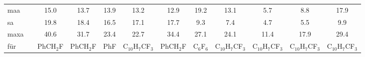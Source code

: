 \begin{table}[ht!]
{\begin{tabular}{lc|ccccc|ccccc}
    \ac{maa}   &       & 15.0  & 13.7  & 13.9  & 13.2  & 12.9  & 19.2  & 13.1  & 5.7   & 8.8   & 17.9 \\
    \ac{sa}   &       & 19.8  & 18.4  & 16.5  & 17.1  & 17.7  & 9.3   & 7.4   & 4.7   & 5.5   & 9.9 \\
    \ac{maxa}  &       & 40.6  & 31.7  & 23.4  & 22.7  & 34.4  & 27.1  & 24.1  & 11.4  & 17.9  & 29.4 \\
    für   &       & PhCH$_{2}$F & PhCH$_{2}$F & PhF   & C$_{10}$H$_{7}$CF$_{3}$ & PhCH$_{2}$F & C$_{6}$F$_{6}$  & C$_{10}$H$_{7}$CF$_{3}$ & C$_{10}$H$_{7}$CF$_{3}$ & C$_{10}$H$_{7}$CF$_{3}$ & C$_{10}$H$_{7}$CF$_{3}$ \\
    \end{tabular}%
  \label{tab:fshifts}}%
\end{table}%


